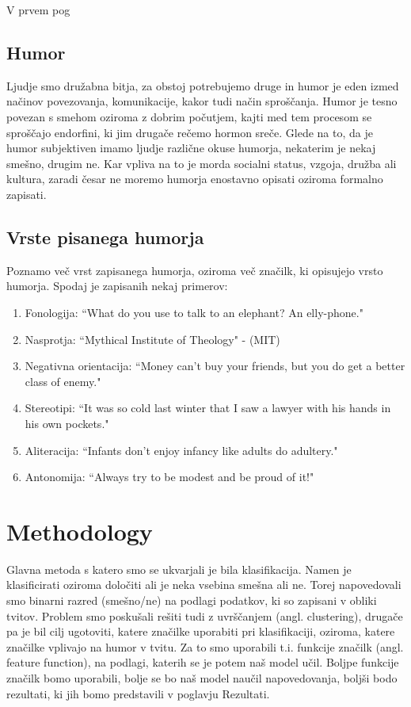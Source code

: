 \documentclass[a4paper]{article}
\begin{document}
V prvem pog

\subsection{Humor}

Ljudje smo družabna bitja, za obstoj potrebujemo druge in humor je eden izmed načinov povezovanja, komunikacije, kakor tudi način sproščanja. Humor je tesno povezan s smehom oziroma z dobrim počutjem, kajti med tem procesom se sproščajo endorfini, ki jim drugače rečemo hormon sreče. Glede na to, da je humor subjektiven imamo ljudje različne okuse humorja, nekaterim je nekaj smešno, drugim ne. Kar vpliva na to je morda socialni status, vzgoja, družba ali kultura, zaradi česar ne moremo humorja enostavno opisati oziroma formalno zapisati.

\newpage

\subsection{Vrste pisanega humorja}

Poznamo več vrst zapisanega humorja, oziroma več značilk, ki opisujejo vrsto humorja. Spodaj je zapisanih nekaj primerov:

\begin{enumerate}
\item Fonologija:	“What do you use to talk to an elephant? An elly-phone."
\item Nasprotja: “Mythical Institute of Theology"  - (MIT)
\item Negativna orientacija: “Money can't buy your friends, but you do get a better class of enemy."
\item Stereotipi: “It was so cold last winter that I saw a lawyer with his hands in his own pockets."
\item Aliteracija: “Infants don’t enjoy infancy like adults do adultery."
\item Antonomija: “Always try to be modest and be proud of it!"
\end{enumerate}

\section{Methodology}

Glavna metoda s katero smo se ukvarjali je bila klasifikacija. Namen je klasificirati oziroma določiti ali je neka vsebina smešna ali ne. Torej napovedovali smo binarni razred (smešno/ne) na podlagi podatkov, ki so zapisani v obliki tvitov. Problem smo poskušali rešiti tudi z uvrščanjem (angl. clustering), drugače pa je bil cilj ugotoviti, katere značilke uporabiti pri klasifikaciji, oziroma, katere značilke vplivajo na humor v tvitu. Za to smo uporabili t.i. funkcije značilk (angl. feature function), na podlagi, katerih se je potem naš model učil. Boljpe funkcije značilk bomo uporabili, bolje se bo naš model naučil napovedovanja, boljši bodo rezultati, ki jih bomo predstavili v poglavju Rezultati.
\end{document}
